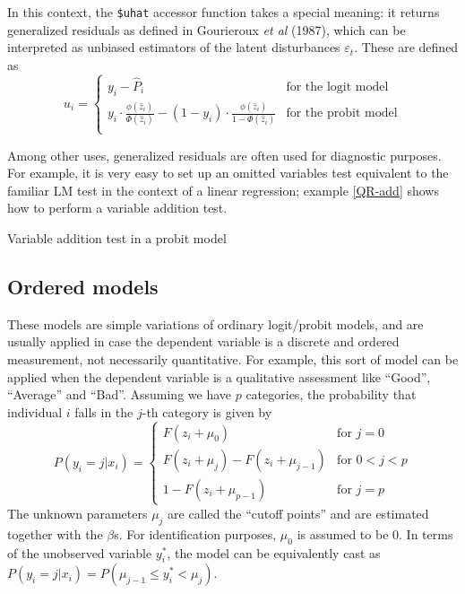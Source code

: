 In this context, the \verb+$uhat+ accessor function takes a
special meaning: it returns generalized residuals as defined in
Gourieroux \textit{et al} (1987), which can be interpreted as unbiased
estimators of the latent disturbances $\varepsilon_t$. These are
defined as
%
\begin{equation}
  \label{eq:QR-genres}
  u_i = \left\{
    \begin{array}{ll}
      y_i - \hat{P}_i & \textrm{for the logit model} \\
      y_i\cdot \frac{\phi(\hat{z}_i)}{\Phi(\hat{z}_i)} - 
      ( 1 - y_i ) \cdot \frac{\phi(\hat{z}_i)}{1 - \Phi(\hat{z}_i)}
      & \textrm{for the probit model} \\
    \end{array}
    \right.
\end{equation}

Among other uses, generalized residuals are often used for diagnostic
purposes.  For example, it is very easy to set up an omitted variables
test equivalent to the familiar LM test in the context of a linear
regression; example \ref{QR-add} shows how to perform a variable
addition test.

\begin{script}[htbp]
  \caption{Variable addition test in a probit model}
  \label{QR-add}
\end{script}

\subsection{Ordered models}
\label{sec:ordered}

These models are simple variations of ordinary logit/probit models,
and are usually applied in case the dependent variable is a discrete
and ordered measurement, not necessarily quantitative. For example,
this sort of model can be applied when the dependent variable is a
qualitative assessment like ``Good'', ``Average'' and ``Bad''.
Assuming we have $p$ categories, the probability that individual $i$
falls in the $j$-th category is given by
%
\begin{equation}
  \label{eq:QR-ordered}
  P(y_i = j | x_i) = \left\{
    \begin{array}{ll}
      F(z_i + \mu_0) & \textrm{for } j = 0 \\
      F(z_i + \mu_j) -  F(z_i + \mu_{j-1}) & \textrm{for } 0 < j < p \\
      1 -  F(z_i + \mu_{p-1}) & \textrm{for } j = p 
    \end{array}
    \right.
\end{equation}
%
The unknown parameters $\mu_j$ are called the ``cutoff
points'' and are estimated together with the $\beta$s. For
identification purposes, $\mu_0$ is assumed to be 0. In terms of the
unobserved variable $y^*_i$, the model can be equivalently cast as
$P(y_i = j | x_i) = P(\mu_{j-1} \le y^*_i < \mu_j)$. 

